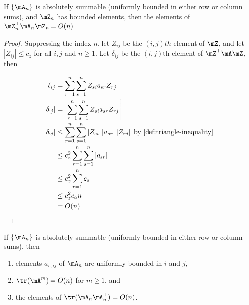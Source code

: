 \documentclass[english,12pt]{book}\usepackage[]{graphicx}\usepackage[]{xcolor}
\begin{document}
\begin{lemma}\label{lemma:bounde_ON}
If $\left\lbrace \mA_n \right\rbrace$ is absolutely summable (uniformly bounded in either row or column sums), and $\mZ_n$ has bounded elements, then the elements of $\mZ_n^\top \mA_n\mZ_n = O(n)$
\end{lemma}

\begin{proof}
  Suppressing the index $n$, let $Z_{ij}$ be the $(i,j)th$ element of $\mZ$, and let $\left|Z_{ij}\right|\leq c_z$ for all $i,j$ and $n\geq 1$. Let $\delta_{ij}$ be the $(i,j)$th element of $\mZ^\top \mA\mZ$, then
  
  \begin{equation}
    \begin{aligned}
      \delta_{ij} & = \sum_{r = 1}^n\sum_{s = 1}^n Z_{si}a_{sr}Z_{rj} \\
      \left|\delta_{ij}\right| & = \left|\sum_{r = 1}^n\sum_{s = 1}^n Z_{si}a_{sr}Z_{rj}\right| \\
      \left|\delta_{ij}\right| & \leq \sum_{r = 1}^n\sum_{s = 1}^n \left|Z_{si}\right| \left|a_{sr}\right|\left|Z_{rj}\right| \; \mbox{by \ref{def:triangle-inequality}} \\
       & \leq c_z^2\sum_{r = 1}^n\sum_{s = 1}^n  \left|a_{sr}\right| \\
        & \leq c_z^2\sum_{r = 1}^n c_a \\
        & \leq c_z^2c_an \\
        & = O(n)
    \end{aligned}
  \end{equation}
\end{proof}

\begin{lemma}\label{lemma:bounde_trace}
If $\left\lbrace \mA_n \right\rbrace$ is absolutely summable (uniformly bounded in either row or column sums), then
\begin{enumerate}
 \item elements $a_{n,ij}$ of $\mA_n$ are uniformly bounded in $i$ and $j$,
 \item $\tr(\mA^m) = O(n)$ for $m\geq 1$, and 
 \item the elements of $\tr(\mA_n\mA_n^\top)= O(n)$.
\end{enumerate}
\end{lemma}
\end{document}
